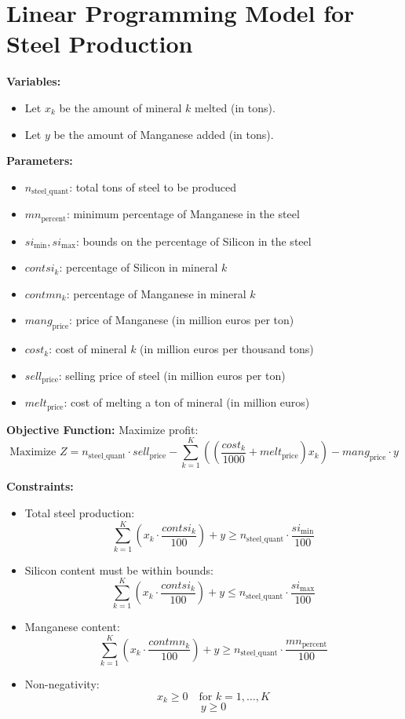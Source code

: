 \documentclass{article}
\begin{document}
\section*{Linear Programming Model for Steel Production}

\textbf{Variables:}
\begin{itemize}
    \item Let \( x_k \) be the amount of mineral \( k \) melted (in tons).
    \item Let \( y \) be the amount of Manganese added (in tons).
\end{itemize}

\textbf{Parameters:}
\begin{itemize}
    \item \( n_{\text{steel\_quant}} \): total tons of steel to be produced
    \item \( mn_{\text{percent}} \): minimum percentage of Manganese in the steel
    \item \( si_{\text{min}}, si_{\text{max}} \): bounds on the percentage of Silicon in the steel
    \item \( contsi_k \): percentage of Silicon in mineral \( k \)
    \item \( contmn_k \): percentage of Manganese in mineral \( k \)
    \item \( mang_{\text{price}} \): price of Manganese (in million euros per ton)
    \item \( cost_k \): cost of mineral \( k \) (in million euros per thousand tons)
    \item \( sell_{\text{price}} \): selling price of steel (in million euros per ton)
    \item \( melt_{\text{price}} \): cost of melting a ton of mineral (in million euros)
\end{itemize}

\textbf{Objective Function:}
Maximize profit:
\[
\text{Maximize } Z = n_{\text{steel\_quant}} \cdot sell_{\text{price}} - \sum_{k=1}^{K} \left( \left(\frac{cost_k}{1000} + melt_{\text{price}}\right) x_k \right) - mang_{\text{price}} \cdot y
\]

\textbf{Constraints:}
\begin{itemize}
    \item Total steel production:
    \[
    \sum_{k=1}^{K} \left( x_k \cdot \frac{contsi_k}{100} \right) + y \geq n_{\text{steel\_quant}} \cdot \frac{si_{\text{min}}}{100}
    \]
    \item Silicon content must be within bounds:
    \[
    \sum_{k=1}^{K} \left( x_k \cdot \frac{contsi_k}{100} \right) + y \leq n_{\text{steel\_quant}} \cdot \frac{si_{\text{max}}}{100}
    \]
    \item Manganese content:
    \[
    \sum_{k=1}^{K} \left( x_k \cdot \frac{contmn_k}{100} \right) + y \geq n_{\text{steel\_quant}} \cdot \frac{mn_{\text{percent}}}{100}
    \]
    \item Non-negativity:
    \[
    x_k \geq 0 \quad \text{for } k = 1,\ldots,K
    \]
    \[
    y \geq 0
    \]
\end{itemize}
\end{document}
